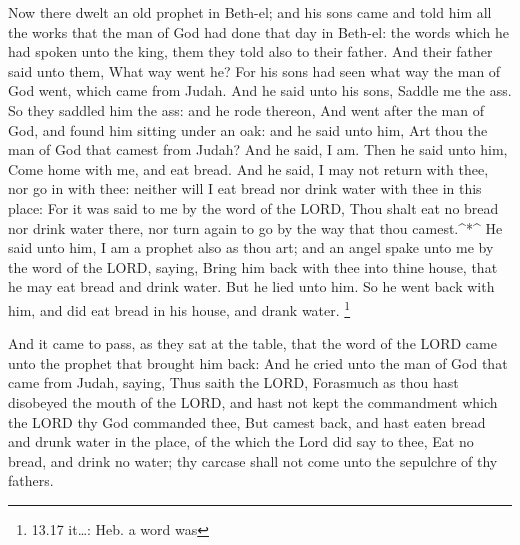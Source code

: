  Now there dwelt an old prophet in Beth-el; and his sons
came and told him all the works that the man of God had done that day in
Beth-el: the words which he had spoken unto the king, them they told
also to their father.  And their father said unto them,
What way went he? For his sons had seen what way the man of God went,
which came from Judah.  And he said unto his sons, Saddle
me the ass. So they saddled him the ass: and he rode thereon,
 And went after the man of God, and found him sitting under
an oak: and he said unto him, Art thou the man of God that camest from
Judah? And he said, I am.  Then he said unto him, Come home
with me, and eat bread.  And he said, I may not return with
thee, nor go in with thee: neither will I eat bread nor drink water with
thee in this place:  For it was said to me by the word of
the LORD, Thou shalt eat no bread nor drink water there, nor turn again
to go by the way that thou camest.\^{}*\^{}  He said unto
him, I am a prophet also as thou art; and an angel spake unto me by the
word of the LORD, saying, Bring him back with thee into thine house,
that he may eat bread and drink water. But he lied unto him.
 So he went back with him, and did eat bread in his house,
and drank water. \footnote{13.17 it\ldots: Heb. a word was}

 And it came to pass, as they sat at the table, that the
word of the LORD came unto the prophet that brought him back:
 And he cried unto the man of God that came from Judah,
saying, Thus saith the LORD, Forasmuch as thou hast disobeyed the mouth
of the LORD, and hast not kept the commandment which the LORD thy God
commanded thee,  But camest back, and hast eaten bread and
drunk water in the place, of the which the Lord did say to thee, Eat no
bread, and drink no water; thy carcase shall not come unto the sepulchre
of thy fathers.

